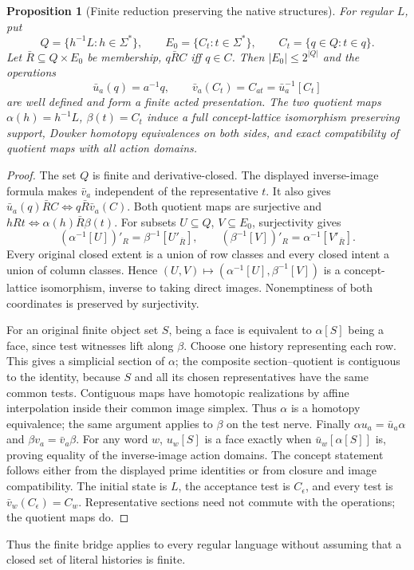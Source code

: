 \documentclass[11pt]{article}
\newtheorem{proposition}[theorem]{Proposition}
\theoremstyle{remark}
\begin{document}
\begin{proposition}[Finite reduction preserving the native structures]
For regular $L$, put
\[
 Q=\{h^{-1}L:h\in\Sigma^*\},\qquad
 E_0=\{C_t:t\in\Sigma^*\},\qquad C_t=\{q\in Q:t\in q\}.
\]
Let $\bar R\subseteq Q\times E_0$ be membership, $q\bar R C$ iff $q\in C$.
Then $|E_0|\leq2^{|Q|}$ and the operations
\[
 \bar u_a(q)=a^{-1}q,\qquad
 \bar v_a(C_t)=C_{at}=\bar u_a^{-1}[C_t]
\]
are well defined and form a finite acted presentation. The two quotient
maps $\alpha(h)=h^{-1}L$, $\beta(t)=C_t$ induce a full concept-lattice
isomorphism preserving support, Dowker homotopy equivalences on both
sides, and exact compatibility of quotient maps with all action domains.
\end{proposition}
\begin{proof}
The set $Q$ is finite and derivative-closed. The displayed inverse-image
formula makes $\bar v_a$ independent of the representative $t$. It also
gives $\bar u_a(q)\bar R C\Longleftrightarrow q\bar R\bar v_a(C)$.
Both quotient maps are surjective and
$hRt\Longleftrightarrow\alpha(h)\bar R\beta(t)$.
For subsets $U\subseteq Q$, $V\subseteq E_0$, surjectivity gives
\[
 (\alpha^{-1}[U])'_R=\beta^{-1}[U'_{\bar R}],\qquad
 (\beta^{-1}[V])'_R=\alpha^{-1}[V'_{\bar R}].
\]
Every original closed extent is a union of row classes and every closed
intent a union of column classes. Hence
$(U,V)\mapsto(\alpha^{-1}[U],\beta^{-1}[V])$ is a concept-lattice
isomorphism, inverse to taking direct images. Nonemptiness of both
coordinates is preserved by surjectivity.

For an original finite object set $S$, being a face is equivalent to
$\alpha[S]$ being a face, since test witnesses lift along $\beta$.
Choose one history representing each row. This gives a simplicial section
of $\alpha$; the composite section--quotient is contiguous to the identity,
because $S$ and all its chosen representatives have the same common tests.
Contiguous maps have homotopic realizations by affine interpolation inside
their common image simplex. Thus $\alpha$ is a homotopy equivalence;
the same argument applies to $\beta$ on the test nerve.
Finally $\alpha u_a=\bar u_a\alpha$ and
$\beta v_a=\bar v_a\beta$. For any word $w$, $u_w[S]$ is a face
exactly when $\bar u_w[\alpha[S]]$ is, proving equality of the inverse-image
action domains. The concept statement follows either from the displayed
prime identities or from closure and image compatibility. The initial
state is $L$, the acceptance test is $C_\epsilon$, and every test is
$\bar v_w(C_\epsilon)=C_w$. Representative sections need not commute
with the operations; the quotient maps do.
\end{proof}
Thus the finite bridge applies to every regular language without assuming
that a closed set of literal histories is finite.
\end{document}

